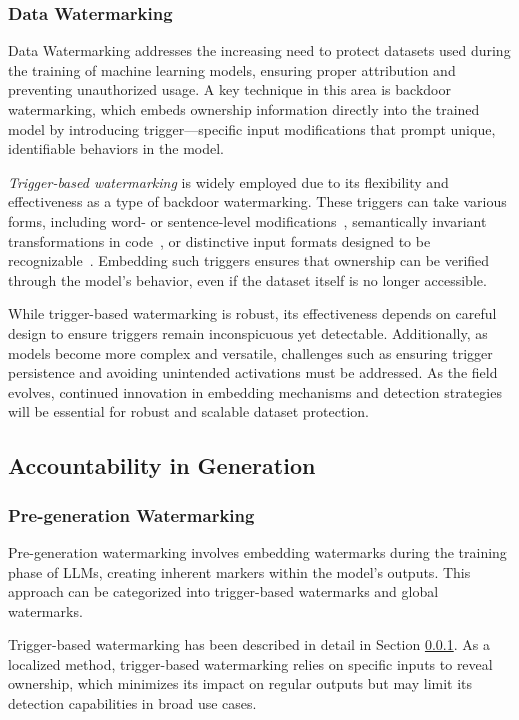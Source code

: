 \subsubsection{Data Watermarking} \label{8.2.2}
Data Watermarking addresses the increasing need to protect datasets used during the training of machine learning models, ensuring proper attribution and preventing unauthorized usage. A key technique in this area is backdoor watermarking, which embeds ownership information directly into the trained model by introducing trigger—specific input modifications that prompt unique, identifiable behaviors in the model.  

\textit{Trigger-based watermarking} is widely employed due to its flexibility and effectiveness as a type of backdoor watermarking. These triggers can take various forms, including word- or sentence-level modifications~\cite{sun2022coprotector}, semantically invariant transformations in code~\cite{sun2023codemark}, or distinctive input formats designed to be recognizable~\cite{xu2024hufu}. Embedding such triggers ensures that ownership can be verified through the model's behavior, even if the dataset itself is no longer accessible.

While trigger-based watermarking is robust, its effectiveness depends on careful design to ensure triggers remain inconspicuous yet detectable. Additionally, as models become more complex and versatile, challenges such as ensuring trigger persistence and avoiding unintended activations must be addressed. As the field evolves, continued innovation in embedding mechanisms and detection strategies will be essential for robust and scalable dataset protection.



\subsection{Accountability in Generation}

\subsubsection{Pre-generation Watermarking}
Pre-generation watermarking involves embedding watermarks during the training phase of LLMs, creating inherent markers within the model's outputs. This approach can be categorized into trigger-based watermarks and global watermarks.


Trigger-based watermarking has been described in detail in Section \ref{8.2.2}. As a localized method, trigger-based watermarking relies on specific inputs to reveal ownership, which minimizes its impact on regular outputs but may limit its detection capabilities in broad use cases.

